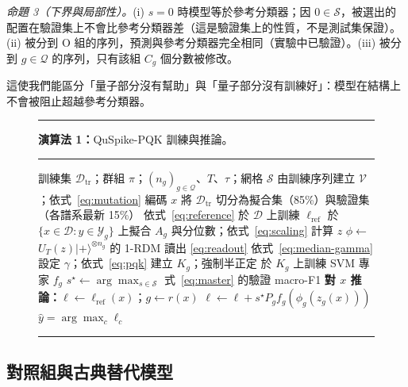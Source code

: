 \documentclass[10pt,a4paper]{article}
\begin{document}
\textit{命題 3（下界與局部性）。}(i) $s=0$ 時模型等於參考分類器；因 $0\in\mathcal{S}$，被選出的配置在驗證集上不會比參考分類器差（這是驗證集上的性質，不是測試集保證）。(ii) 被分到 O 組的序列，預測與參考分類器完全相同（實驗中已驗證）。(iii) 被分到 $g\in\mathcal{Q}$ 的序列，只有該組 $C_g$ 個分數被修改。

這使我們能區分「量子部分沒有幫助」與「量子部分沒有訓練好」：模型在結構上不會被阻止超越參考分類器。

\begin{figure}[!htb]
    \centering
    \begin{minipage}{0.92\textwidth}
    \hrule\smallskip
    \noindent\textbf{演算法 1：}QuSpike-PQK 訓練與推論。
    \smallskip\hrule\smallskip
    \small
    \begin{algorithmic}[1]
        \REQUIRE 訓練集 $\mathcal{D}_{\mathrm{tr}}$；群組 $\pi$；$(n_g)_{g\in\mathcal{Q}}$、$T$、$\tau$；網格 $\mathcal{S}$
        \STATE 由訓練序列建立 $\mathcal{V}$；依式~\eqref{eq:mutation} 編碼 $x$
        \STATE 將 $\mathcal{D}_{\mathrm{tr}}$ 切分為擬合集（85\%）與驗證集（各譜系最新 15\%）
            \STATE 依式~\eqref{eq:reference} 於 $\mathcal{D}$ 上訓練 $\ell_{\mathrm{ref}}$
                \STATE 於 $\{x\in\mathcal{D}:y\in\mathcal{Y}_g\}$ 上擬合 $A_g$ 與分位數；依式~\eqref{eq:scaling} 計算 $z$
                \STATE $\phi\leftarrow$ $U_T(z)|{+}\rangle^{\otimes n_g}$ 的 1-RDM 讀出 \eqref{eq:readout} 
                \STATE 依式~\eqref{eq:median-gamma} 設定 $\gamma$；依式~\eqref{eq:pqk} 建立 $K_g$；強制半正定
                \STATE 於 $K_g$ 上訓練 SVM 專家 $f_g$
            \ENDFOR
                \STATE $s^{\star}\leftarrow\arg\max_{s\in\mathcal{S}}$ 式~\eqref{eq:master} 的驗證 macro-F1
            \ENDIF
        \ENDFOR
        \STATE \textbf{對 $x$ 推論：}$\ell\leftarrow\ell_{\mathrm{ref}}(x)$；$g\leftarrow r(x)$
            \STATE $\ell\leftarrow\ell+s^{\star}P_g f_g(\phi_g(z_g(x)))$
        \ENDIF
        \RETURN $\hat{y}=\arg\max_c\ell_c$
    \end{algorithmic}
    \smallskip\hrule
    \end{minipage}
\end{figure}

\subsection{對照組與古典替代模型}
\label{sec:controls}
\end{document}
